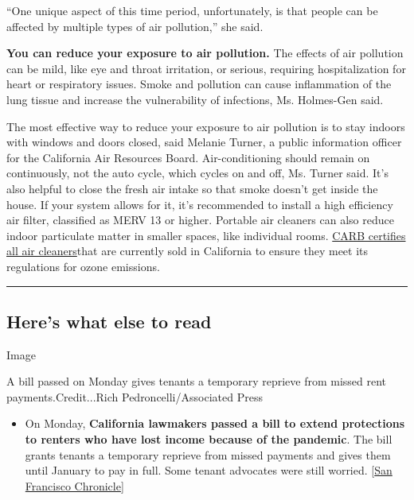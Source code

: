 ``One unique aspect of this time period, unfortunately, is that people
can be affected by multiple types of air pollution,'' she said.

\textbf{You can reduce your exposure to air pollution.} The effects of
air pollution can be mild, like eye and throat irritation, or serious,
requiring hospitalization for heart or respiratory issues. Smoke and
pollution can cause inflammation of the lung tissue and increase the
vulnerability of infections, Ms. Holmes-Gen said.

The most effective way to reduce your exposure to air pollution is to
stay indoors with windows and doors closed, said Melanie Turner, a
public information officer for the California Air Resources Board.
Air-conditioning should remain on continuously, not the auto cycle,
which cycles on and off, Ms. Turner said. It's also helpful to close the
fresh air intake so that smoke doesn't get inside the house. If your
system allows for it, it's recommended to install a high efficiency air
filter, classified as MERV 13 or higher. Portable air cleaners can also
reduce indoor particulate matter in smaller spaces, like individual
rooms.
\href{https://ww2.arb.ca.gov/our-work/programs/air-cleaners-ozone-products/california-certified-air-cleaning-devices}{CARB
certifies all air cleaners}that are currently sold in California to
ensure they meet its regulations for ozone emissions.

\begin{center}\rule{0.5\linewidth}{\linethickness}\end{center}

\hypertarget{heres-what-else-to-read}{%
\subsection{Here's what else to read}\label{heres-what-else-to-read}}

Image

A bill passed on Monday gives tenants a temporary reprieve from missed
rent payments.Credit...Rich Pedroncelli/Associated Press

\begin{itemize}
\tightlist
\item
  On Monday, \textbf{California lawmakers passed a bill to extend
  protections to renters who have lost income because of the pandemic}.
  The bill grants tenants a temporary reprieve from missed payments and
  gives them until January to pay in full. Some tenant advocates were
  still worried.
  {[}\href{https://www.sfchronicle.com/politics/article/Eviction-moratorium-moves-forward-in-California-15528629.php}{San
  Francisco Chronicle}{]}
\end{itemize}

